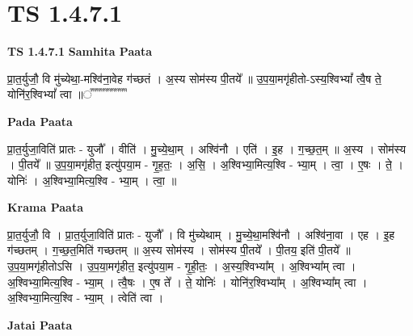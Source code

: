 \documentclass[17pt]{extarticle}
\begin{document}
\section{ TS 1.4.7.1 }

\textbf{TS 1.4.7.1 } \newline
\textbf{Samhita Paata} \newline

प्रा॒त॒र्युजौ॒ वि मु॑च्येथा॒-मश्वि॑ना॒वेह ग॑च्छतं । अ॒स्य सोम॑स्य पी॒तये᳚ ॥ उ॒प॒या॒मगृ॑हीतो-ऽस्य॒श्विभ्यां᳚ त्वै॒ष ते॒ योनि॑र॒श्विभ्यां᳚ त्वा ॥꣡꣡꣡꣡꣡꣡꣡꣡꣡꣡꣡꣡꣡꣡꣡꣡꣡꣡ \newline

\textbf{Pada Paata} \newline

प्रा॒त॒र्युजा॒विति॑ प्रातः - युजौ᳚ । वीति॑ । मु॒च्ये॒था॒म् । अश्वि॑नौ । एति॑ । इ॒ह । ग॒च्छ॒त॒म् ॥ अ॒स्य । सोम॑स्य । पी॒तये᳚ ॥ उ॒प॒या॒मगृ॑हीत॒ इत्यु॑पया॒म - गृ॒ह॒तः॒ । अ॒सि॒ । अ॒श्विभ्या॒मित्य॒श्वि - भ्या॒म् । त्वा॒ । ए॒षः । ते॒ । योनिः॑ । अ॒श्विभ्या॒मित्य॒श्वि - भ्या॒म् । त्वा॒ ॥  \newline


\textbf{Krama Paata} \newline

प्रा॒त॒र्युजौ॒ वि । प्रा॒त॒र्युजा॒विति॑ प्रातः - युजौ᳚ । वि मु॑च्येथाम् । मु॒च्ये॒था॒मश्वि॑नौ । अश्वि॑ना॒वा । एह । इ॒ह ग॑च्छतम् । ग॒च्छ॒त॒मिति॑ गच्छतम् ॥ अ॒स्य सोम॑स्य । सोम॑स्य पी॒तये᳚ । पी॒तय॒ इति॑ पी॒तये᳚ ॥ उ॒प॒या॒मगृ॑हीतोऽसि । उ॒प॒या॒मगृ॑हीत॒ इत्यु॑पया॒म - गृ॒ही॒तः॒ । अ॒स्य॒श्विभ्या᳚म् । अ॒श्विभ्या᳚म् त्वा । अ॒श्विभ्या॒मित्य॒श्वि - भ्या॒म् । त्वै॒षः । ए॒ष ते᳚ । ते॒ योनिः॑ । योनि॑र॒श्विभ्या᳚म् । अ॒श्विभ्या᳚म् त्वा । अ॒श्विभ्या॒मित्य॒श्वि - भ्या॒म् । त्वेति॑ त्वा । \newline

\textbf{Jatai Paata} \newline
\end{document}
